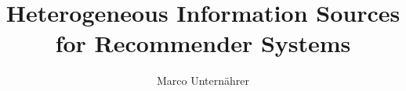 \documentclass{ddis-thesis}
\author{Marco Unternährer}
\title{Heterogeneous Information Sources for Recommender Systems}
\begin{document}

\frontmatter






\tableofcontents

\mainmatter








\appendix


\backmatter

\normalfont
\clearpage
\listoffigures

\clearpage
\listoftables
\end{document}
